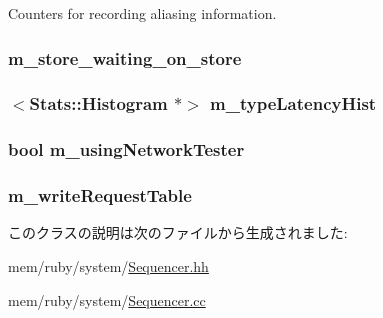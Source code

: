 Counters for recording aliasing information. \hypertarget{classSequencer_a79cb8a27dd783e3c7298d8d874795b3d}{
\subsubsection[{m\_\-store\_\-waiting\_\-on\_\-store}]{ {\bf m\_\-store\_\-waiting\_\-on\_\-store}}}
\label{classSequencer_a79cb8a27dd783e3c7298d8d874795b3d}
\hypertarget{classSequencer_a21453ca0672126e1c0e204b7c60b3340}{
\subsubsection[{m\_\-typeLatencyHist}]{$<${\bf Stats::Histogram} $\ast$$>$ {\bf m\_\-typeLatencyHist}}}
\label{classSequencer_a21453ca0672126e1c0e204b7c60b3340}
\hypertarget{classSequencer_a6e3aaea8b048e1811c53f89dfb99260e}{
\subsubsection[{m\_\-usingNetworkTester}]{\setlength{\rightskip}{0pt plus 5cm}bool {\bf m\_\-usingNetworkTester}}}
\label{classSequencer_a6e3aaea8b048e1811c53f89dfb99260e}
\hypertarget{classSequencer_ad419eb325e663790853ec757ca3b02aa}{
\subsubsection[{m\_\-writeRequestTable}]{ {\bf m\_\-writeRequestTable}}}
\label{classSequencer_ad419eb325e663790853ec757ca3b02aa}


このクラスの説明は次のファイルから生成されました:\begin{DoxyCompactItemize}
\item 
mem/ruby/system/\hyperlink{Sequencer_8hh}{Sequencer.hh}\item 
mem/ruby/system/\hyperlink{Sequencer_8cc}{Sequencer.cc}\end{DoxyCompactItemize}
